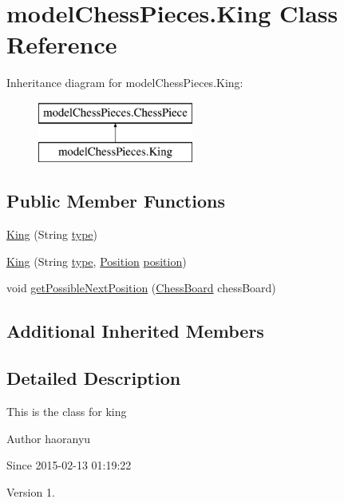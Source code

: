 \hypertarget{classmodel_chess_pieces_1_1_king}{\section{model\+Chess\+Pieces.\+King Class Reference}
\label{classmodel_chess_pieces_1_1_king}
}
Inheritance diagram for model\+Chess\+Pieces.\+King\+:\begin{figure}[H]
\begin{center}
\leavevmode
\includegraphics[height=2.000000cm]{classmodel_chess_pieces_1_1_king}
\end{center}
\end{figure}
\subsection*{Public Member Functions}
\begin{DoxyCompactItemize}
\item 
\hyperlink{classmodel_chess_pieces_1_1_king_addca0068eced10beccbb62407358e10a}{King} (String \hyperlink{classmodel_chess_pieces_1_1_chess_piece_a195487ca88c197af7c1604247be31db2}{type})
\item 
\hyperlink{classmodel_chess_pieces_1_1_king_a304e8f6364f887674d05a98e7a6f3ea1}{King} (String \hyperlink{classmodel_chess_pieces_1_1_chess_piece_a195487ca88c197af7c1604247be31db2}{type}, \hyperlink{classmodel_core_1_1_position}{Position} \hyperlink{classmodel_chess_pieces_1_1_chess_piece_a3d4362d5b28f6edb14161196d9c6807d}{position})
\item 
void \hyperlink{classmodel_chess_pieces_1_1_king_ac5d6a00b703d61fb300a193e960c3b08}{get\+Possible\+Next\+Position} (\hyperlink{classmodel_core_1_1_chess_board}{Chess\+Board} chess\+Board)
\end{DoxyCompactItemize}
\subsection*{Additional Inherited Members}


\subsection{Detailed Description}
This is the class for king \begin{DoxyAuthor}{Author}
haoranyu 
\end{DoxyAuthor}
\begin{DoxySince}{Since}
2015-\/02-\/13 01\+:19\+:22 
\end{DoxySince}
\begin{DoxyVersion}{Version}
1. 
\end{DoxyVersion}


